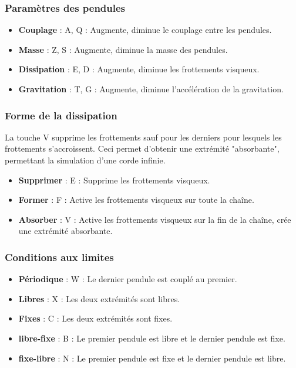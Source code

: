 \subsubsection{Paramètres des pendules}
%
\begin{itemize}[label=, leftmargin=2cm, itemsep=0pt]
\item {\bf Couplage} : {\sf A}, {\sf Q} : Augmente, diminue le couplage entre les pendules.
\item {\bf Masse} : {\sf Z}, {\sf S} :  Augmente, diminue la masse des pendules.
\item {\bf Dissipation} : {\sf E}, {\sf D} :  Augmente, diminue les frottements visqueux.
\item {\bf Gravitation} : {\sf T}, {\sf G} :  Augmente, diminue l'accélération de la gravitation.
\end{itemize}
%
%
\subsubsection{Forme de la dissipation}
%
La touche {\sf V} supprime les frottements sauf pour les derniers pour lesquels les frottements s'accroissent. Ceci permet d'obtenir une extrémité "absorbante", permettant la simulation d'une corde infinie.
%
\begin{itemize}[label=, leftmargin=2cm, itemsep=0pt]
\item {\bf Supprimer} : {\sf E} : Supprime les frottements visqueux.
\item {\bf Former} : {\sf F} : Active les frottements visqueux sur toute la chaîne.
\item {\bf Absorber} : {\sf V} : Active les frottements visqueux sur la fin de la chaîne, crée une extrémité absorbante.
\end{itemize}
%
%
\subsubsection{Conditions aux limites}
%
\begin{itemize}[label=, leftmargin=2cm, itemsep=0pt]
\item {\bf Périodique} : {\sf W} : Le dernier pendule est couplé au premier.
\item {\bf Libres} : {\sf X} : Les deux extrémités sont libres.
\item {\bf Fixes} : {\sf C} : Les deux extrémités sont fixes.
\item {\bf libre-fixe} : {\sf B} : Le premier pendule est libre et le dernier pendule est fixe.
\item {\bf fixe-libre} : {\sf N} : Le premier pendule est fixe et le dernier pendule est libre.
\end{itemize}
%
%
